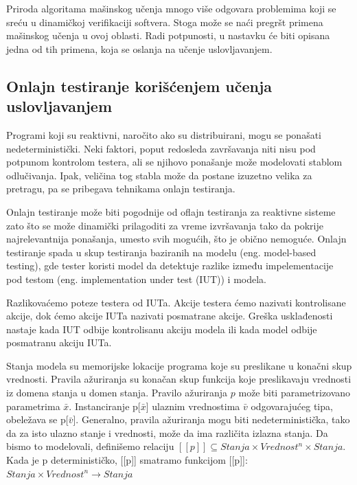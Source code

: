 \documentclass[a4paper]{article}
\theoremstyle{definition}
\begin{document}
{Priroda algoritama mašinskog učenja mnogo više odgovara problemima koji se sreću 
u dinamičkoj verifikaciji softvera. Stoga može se naći pregršt primena mašinskog 
učenja u ovoj oblasti. Radi potpunosti, u nastavku će biti opisana jedna od tih 
primena, koja se oslanja na učenje uslovljavanjem.

\subsection{Onlajn testiranje korišćenjem učenja uslovljavanjem } %


Programi koji su reaktivni, naročito ako su distribuirani, mogu se ponašati nedeterministički. Neki faktori, poput redosleda završavanja niti nisu pod potpunom kontrolom testera, ali se njihovo ponašanje može modelovati stablom odlučivanja. Ipak, veličina tog stabla može da postane izuzetno velika za pretragu, pa se pribegava tehnikama onlajn testiranja. %

Onlajn testiranje može biti pogodnije od oflajn testiranja za reaktivne sisteme zato što se može dinamički prilagoditi za vreme izvršavanja tako da pokrije najrelevantnija ponašanja, umesto svih mogućih, što je obično nemoguće. Onlajn testiranje spada u skup testiranja baziranih na modelu (eng. model-based testing), gde tester koristi model da detektuje razlike između impelementacije pod testom (eng. implementation under test (IUT)) i modela. %

Razlikovaćemo poteze testera od IUTa. Akcije testera ćemo nazivati kontrolisane akcije, dok ćemo akcije IUTa nazivati posmatrane akcije. Greška usklađenosti nastaje kada IUT odbije kontrolisanu akciju modela ili kada model odbije posmatranu akciju IUTa. %

Stanja modela su memorijske lokacije programa koje su preslikane u konačni skup vrednosti. 
Pravila ažuriranja su konačan skup funkcija koje preslikavaju vrednosti iz domena stanja u domen stanja. Pravilo ažuriranja $p$ može biti parametrizovano parametrima $\bar{x}$.
Instanciranje p[$\bar{x}$] ulaznim vrednostima $\bar{v}$ odgovarajućeg tipa, obeležava se p[$\bar{v}$].
Generalno, pravila ažuriranja mogu biti nedeterministička, tako da za isto ulazno stanje i vrednosti, može da ima različita izlazna stanja. Da bismo to modelovali, definišemo relaciju $[[p]] \subseteq Stanja \times Vrednost^n \times Stanja$.
Kada je p determinističko, [[p]] smatramo funkcijom [[p]]: $Stanja \times Vrednost^n  \rightarrow Stanja$

}
\end{document}
